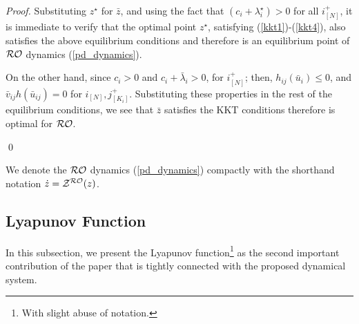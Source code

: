 \documentclass[journal,twoside,web]{ieeecolor}
\begin{document}
\begin{proof}
Substituting $z^\star$ for $\bar{z}$, and using the fact that $(c_i+\lambda_i^\star)>0$ for all $i^+_{[N]}$, it is immediate to verify that the optimal point $z^\star$, satisfying (\ref{kkt1})-(\ref{kkt4}), also satisfies the above equilibrium conditions and therefore is an equilibrium point of ${\cal RO}$ dynamics (\ref{pd_dynamics}).

On the other hand, since $c_i> 0$ and $c_i+\bar{\lambda}_i>0$,  for $i_{[N]}^+$; then, $h_{ij}(\bar{u}_i)\leq 0$, and $\bar{v}_{ij} h(\bar{u}_{ij})=0$ for $i_{[N]},j_{[K_i]}^+$. Substituting these properties in the rest of the equilibrium conditions, we see that $\bar{z}$ satisfies the KKT conditions therefore is optimal for ${\cal RO}$.

\qed
\end{proof}

We denote the ${\cal RO}$ dynamics (\ref{pd_dynamics}) compactly with the shorthand notation $\dot z={\cal Z}^{\cal RO}(z)$.

\subsection{Lyapunov Function}
In this subsection, we present the Lyapunov function\footnote{With slight abuse of notation.} as the second important contribution of the paper that is tightly connected with the proposed dynamical system.
\end{document}
